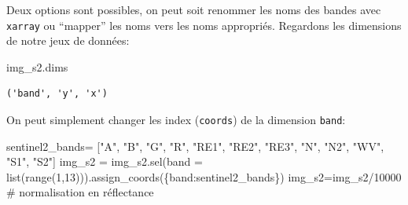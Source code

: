 \documentclass[
  french,
  11pt,
  letterpaper,
  open=any,
  twoside=false,
  french]{scrbook}
\newenvironment{Shaded}{\begin{snugshade}}{\end{snugshade}}
\newcommand{\BuiltInTok}[1]{\textcolor[rgb]{0.00,0.23,0.31}{#1}}
\newcommand{\CommentTok}[1]{\textcolor[rgb]{0.37,0.37,0.37}{#1}}
\newcommand{\DecValTok}[1]{\textcolor[rgb]{0.68,0.00,0.00}{#1}}
\newcommand{\NormalTok}[1]{\textcolor[rgb]{0.00,0.23,0.31}{#1}}
\newcommand{\OperatorTok}[1]{\textcolor[rgb]{0.37,0.37,0.37}{#1}}
\newcommand{\StringTok}[1]{\textcolor[rgb]{0.13,0.47,0.30}{#1}}
\begin{document}
Deux options sont possibles, on peut soit renommer les noms des bandes
avec \texttt{xarray} ou ``mapper'' les noms vers les noms appropriés.
Regardons les dimensions de notre jeux de données:

\begin{Shaded}
\begin{Highlighting}[]
\NormalTok{img\_s2.dims}
\end{Highlighting}
\end{Shaded}

\begin{verbatim}
('band', 'y', 'x')
\end{verbatim}

On peut simplement changer les index (\texttt{coords}) de la dimension
\texttt{band}:

\begin{Shaded}
\begin{Highlighting}[]
\NormalTok{sentinel2\_bands}\OperatorTok{=}\NormalTok{ [}\StringTok{"A"}\NormalTok{, }\StringTok{"B"}\NormalTok{, }\StringTok{"G"}\NormalTok{, }\StringTok{"R"}\NormalTok{, }\StringTok{"RE1"}\NormalTok{, }\StringTok{"RE2"}\NormalTok{, }\StringTok{"RE3"}\NormalTok{, }\StringTok{"N"}\NormalTok{, }\StringTok{"N2"}\NormalTok{, }\StringTok{"WV"}\NormalTok{, }\StringTok{"S1"}\NormalTok{, }\StringTok{"S2"}\NormalTok{]}
\NormalTok{img\_s2 }\OperatorTok{=}\NormalTok{ img\_s2.sel(band }\OperatorTok{=} \BuiltInTok{list}\NormalTok{(}\BuiltInTok{range}\NormalTok{(}\DecValTok{1}\NormalTok{,}\DecValTok{13}\NormalTok{))).assign\_coords(\{}\StringTok{\textquotesingle{}band\textquotesingle{}}\NormalTok{:sentinel2\_bands\})}
\NormalTok{img\_s2}\OperatorTok{=}\NormalTok{img\_s2}\OperatorTok{/}\DecValTok{10000} \CommentTok{\# normalisation en réflectance}
\end{Highlighting}
\end{Shaded}
\end{document}
